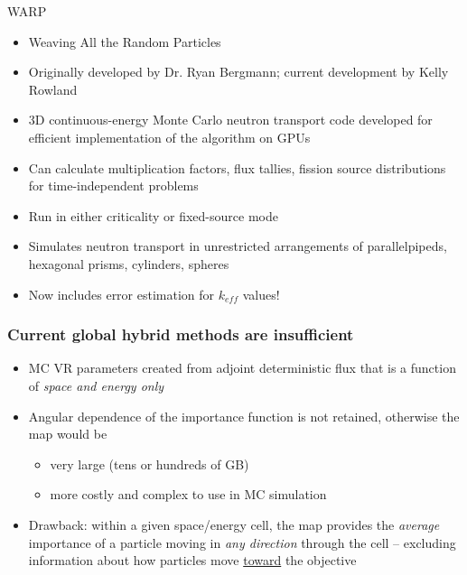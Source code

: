 \documentclass[xcolor=x11names,compress]{beamer}
\renewcommand{\(}{\begin{columns}}
\renewcommand{\)}{\end{columns}}
\newcommand{\<}[1]{\begin{column}{#1}}
\renewcommand{\>}{\end{column}}
\begin{document}
\begin{frame}{WARP \cite{warp}}
	\begin{itemize}
	\item{Weaving All the Random Particles}
	\pause
	\item{Originally developed by Dr. Ryan Bergmann; current development by Kelly Rowland}
	\pause
	\item{3D continuous-energy Monte Carlo neutron transport code developed for efficient implementation of the algorithm on GPUs}
	\item{Can calculate multiplication factors, flux tallies, fission source distributions for time-independent problems}
	\item{Run in either criticality or fixed-source mode}
	\item{Simulates neutron transport in unrestricted arrangements of parallelpipeds, hexagonal prisms, cylinders, spheres}
	\pause
	\item{Now includes error estimation for $k_{eff}$ values!}
	\end{itemize}
\end{frame}

\begin{frame}[fragile]
  \frametitle{Current global hybrid methods are insufficient}

	\begin{itemize}
	\item MC VR parameters created from adjoint deterministic flux that is a function of \emph{space and energy only}
	\item Angular dependence of the importance function is not retained, otherwise the map would be
	  \begin{itemize}
	  \item very large (tens or hundreds of GB)
	  \item more costly and complex to use in MC simulation
      \end{itemize}	   
	\item Drawback: within a given space/energy cell, the map provides the \emph{average} importance of a particle moving in \emph{any direction} through the cell -- excluding information about how particles move \underline{toward} the objective
	\end{itemize}

\end{frame}
\end{document}
